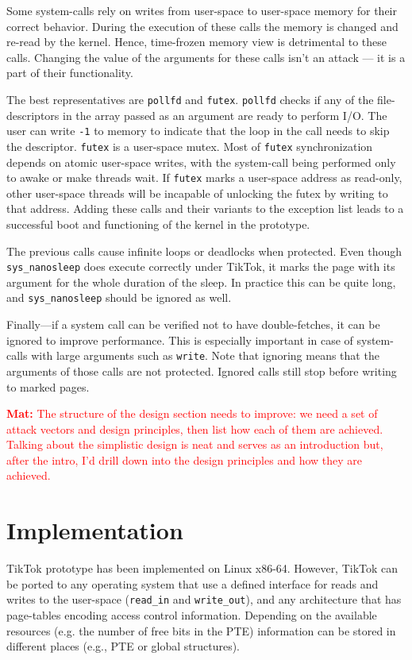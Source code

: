 \documentclass[conference]{IEEEtran}
\newcommand{\mat}[1]{\textcolor{red}{\textbf{Mat:} #1}}
\newcommand{\sysname}{TikTok}
\begin{document}
Some system-calls rely on writes from user-space to user-space memory for their
correct behavior. During the execution of these calls the memory is changed and
re-read by the kernel. Hence, time-frozen memory view is detrimental to these calls.
Changing the value of the arguments for these calls isn't an attack --- it is a
part of their functionality.

The best representatives are \texttt{pollfd} and \texttt{futex}. \texttt{pollfd}
checks if any of the file-descriptors in the array passed as an argument are
ready to perform I/O. The user can write \texttt{-1} to memory to indicate that
the loop in the call needs to skip the descriptor. \texttt{futex} is a
user-space mutex. Most of \texttt{futex} synchronization depends on atomic
user-space writes, with the system-call being performed only to awake or make
threads wait. If \texttt{futex} marks a user-space address as read-only, other
user-space threads will be incapable of unlocking the futex by writing to that
address. Adding these calls and their variants to the exception list leads to a
successful boot and functioning of the kernel in the prototype.

The previous calls cause infinite loops or deadlocks when protected. Even though
\texttt{sys\_nanosleep} does execute correctly under \sysname{}, it marks the page
with its argument for the whole duration of the sleep. In practice this can be
quite long, and \texttt{sys\_nanosleep} should be ignored as well.

Finally---if a system call can be verified not to have double-fetches, it can
be ignored to improve performance. This is especially important in case of
system-calls with large arguments such as \texttt{write}. Note that ignoring
means that the arguments of those calls are not protected. Ignored calls
still stop before writing to marked pages.

\mat{The structure of the design section needs to improve: we need a set of
attack vectors and design principles, then list how each of them are achieved.
Talking about the simplistic design is neat and serves as an introduction but,
after the intro, I'd drill down into the design principles and how they are
achieved.}


\section{Implementation}
\label{sec:implementation}

\sysname{} prototype has been implemented on Linux x86-64. However, \sysname{} can be
ported to any operating system that use a defined interface for reads and
writes to the user-space (\texttt{read\_in} and \texttt{write\_out}), and any
architecture that has page-tables encoding access control information. Depending
on the available resources (e.g. the number of free bits in the PTE) information
can be stored in different places (e.g., PTE or global structures).
\end{document}
